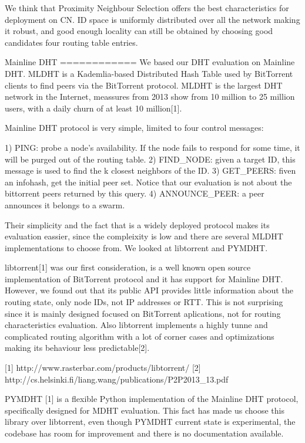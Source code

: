 We think that Proximity Neighbour Selection offers the best characteristics for deployment on CN. ID space is uniformly distributed over all the network making it robust, and good enough locality can still be obtained by choosing good candidates four routing table entries.


Mainline DHT
============
We based our DHT evaluation on Mainline DHT. MLDHT is a Kademlia-based Distributed Hash Table used by BitTorrent clients to find peers via the BitTorrent protocol. MLDHT is the largest DHT network in the Internet, meassures from 2013 show from 10 million to 25 million users, with a daily churn of at least 10 million[1].

Mainline DHT protocol is very simple, limited to four control messages:

1) PING: probe a node's availability. If the node fails to respond for some time, it will be purged out of the routing table.
2) FIND_NODE: given a target ID, this message is used to find the {k} closest neighbors of the ID.
3) GET_PEERS: fiven an infohash, get the initial peer set. Notice that our evaluation is not about the bittorrent peers returned by this query.
4) ANNOUNCE_PEER: a peer announces it belongs to a swarm.


Their simplicity and the fact that is a widely deployed protocol makes its evaluation eassier, since the compleixity is low and there are several MLDHT implementations to choose from. We looked at libtorrent and PYMDHT.

libtorrent[1] was our first consideration, is a well known open source implementation of BitTorrent protocol and it has support for Mainline DHT. However, we found out that its public API provides little information about the routing state, only node IDs, not IP addresses or RTT. This is not surprising since it is mainly designed focused on BitTorrent aplications, not for routing characteristics evaluation. Also libtorrent implements a highly tunne and complicated routing algorithm with a lot of corner cases and optimizations making its behaviour less predictable[2].

    [1] http://www.rasterbar.com/products/libtorrent/
    [2] http://cs.helsinki.fi/liang.wang/publications/P2P2013_13.pdf

PYMDHT [1] is a flexible Python implementation of the Mainline DHT protocol, specifically designed for MDHT evaluation. This fact has made us choose this library over libtorrent, even though PYMDHT current state is experimental, the codebase has room for improvement and there is no documentation available.

